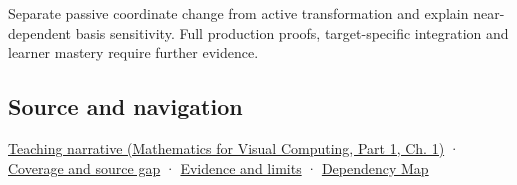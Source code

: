 Separate passive coordinate change from active transformation and explain near-dependent basis sensitivity. Full production proofs, target-specific integration and learner mastery require further evidence.

\subsection{Source and navigation}\label{appendix-ce0341f7ea0d-source-and-navigation}

\hypertarget{appendix-ce0341f7ea0d-source-and-navigation}{}

\href{../02-Mathematics-for-Visual-Computing-P01/main.pdf\#01-foundations-i-ch017-a-basis-is-a-measuring-arrangement-not-the-vector-itself}{Teaching narrative (Mathematics for Visual Computing, Part 1, Ch. 1)} · \hyperref[appendix-fd090d982a15-phase-6---parts-501-600]{Coverage and source gap} · \hyperref[appendix-a103e7846d21-phase-6---source-analysis-and-verification]{Evidence and limits} · \hyperref[appendix-4ad47bdd269a]{Dependency Map}
